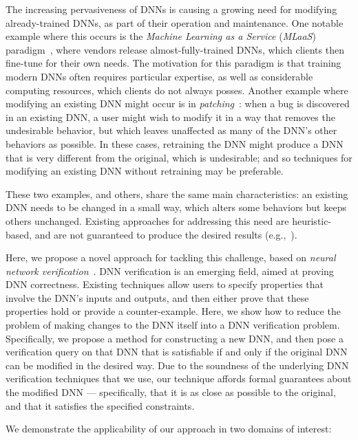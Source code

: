 \documentclass{easychair}
\begin{document}
The increasing pervasiveness of DNNs is causing a growing need for
modifying already-trained DNNs, as part of their operation and
maintenance. One notable example where this occurs is the
\emph{Machine Learning as a Service} (\emph{MLaaS})
paradigm~\cite{RiGrCa15}, where vendors release almost-fully-trained
DNNs, which clients then fine-tune for their own needs. The motivation
for this paradigm is that training modern DNNs often requires
particular expertise, as well as considerable computing resources,
which clients do not always posses. Another example where modifying an
existing DNN might occur is in \emph{patching}~\cite{SoTh19}: when a
bug is discovered in an existing DNN, a user might wish to modify it
in a way that removes the undesirable behavior, but which leaves
unaffected as many of the DNN's other behaviors as possible. In these
cases, retraining the DNN might produce a DNN that is very different
from the original, which is undesirable; and so techniques for
modifying an existing DNN without retraining may be preferable.

These two examples, and others, share the same main characteristics: an
existing DNN needs to be changed in a small way, which alters some
behaviors but keeps others unchanged. Existing approaches for
addressing this need are heuristic-based, and are not guaranteed to
produce the desired results (e.g.,~\cite{KaLe18,KaFu18,SoTh19}).

Here, we propose a novel approach for tackling this challenge, based
on \emph{neural network
  verification}~\cite{HuKwWaWu17,KaBaDiJuKo17Reluplex}. DNN
verification is an emerging field, aimed at proving DNN correctness.
Existing techniques allow users to specify properties that involve the
DNN's inputs and outputs, and then either prove that these properties hold
or provide a counter-example. Here, we show how to reduce the problem
of making changes to the DNN itself into a DNN verification
problem. Specifically, we propose a method for constructing a new DNN,
and then pose a verification query on that DNN that is satisfiable if
and only if the original DNN can be modified in the desired way. Due
to the soundness of the underlying DNN verification techniques that we
use, our technique affords formal guarantees about the modified DNN
--- specifically, that it is as close as possible to the original, and
that it satisfies the specified constraints.


We demonstrate the applicability of our approach in two domains of interest:
\end{document}
